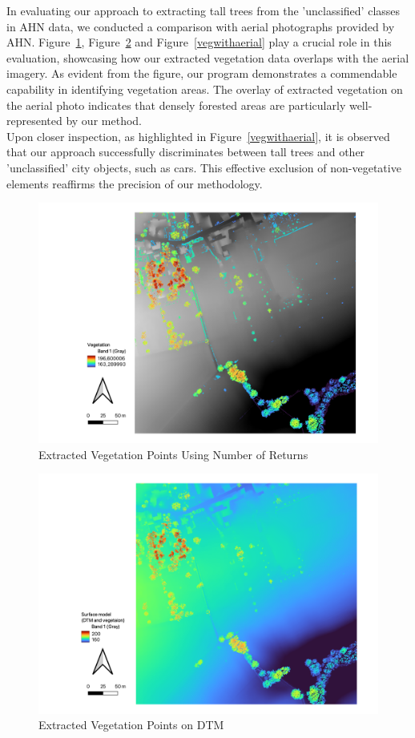 \documentclass{article}
\begin{document}
\noindent In evaluating our approach to extracting tall trees from the 'unclassified' classes in AHN data, we conducted a comparison with aerial photographs provided by AHN. Figure~\ref{vege}, Figure~\ref{vegwithdtm} and Figure~\ref{vegwithaerial} play a crucial role in this evaluation, showcasing how our extracted vegetation data overlaps with the aerial imagery. As evident from the figure, our program demonstrates a commendable capability in identifying vegetation areas. The overlay of extracted vegetation on the aerial photo indicates that densely forested areas are particularly well-represented by our method.\\

\noindent Upon closer inspection, as highlighted in Figure~\ref{vegwithaerial}, it is observed that our approach successfully discriminates between tall trees and other 'unclassified' city objects, such as cars. This effective exclusion of non-vegetative elements reaffirms the precision of our methodology.\\

\begin{figure}[H]
    \centering
    \includegraphics[width=0.7\linewidth]{Figures/vegetation.png}
    \caption{Extracted Vegetation Points Using Number of Returns}
    \label{vege}
\end{figure}


\begin{figure}[H]
    \centering
    \includegraphics[width=0.7\linewidth]{Figures/vegeation and DTM.png}
    \caption{Extracted Vegetation Points on DTM}
    \label{vegwithdtm}
\end{figure}
\end{document}
